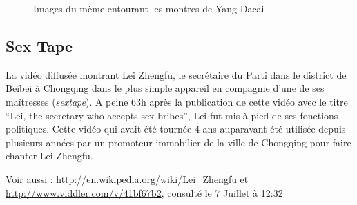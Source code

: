 \begin{figure}[h!]
    \caption{
      Images du mème entourant les montres de Yang Dacai
    }
\end{figure}

\clearpage
\subsection{Sex Tape}
\label{sec:sextape}

La vidéo diffusée montrant Lei Zhengfu, le secrétaire du Parti dans le district de Beibei à Chongqing dans le plus simple appareil en compagnie d'une de ses maîtresses (\textit{sextape}). A peine 63h après la publication de cette vidéo avec le titre ``Lei, the secretary who accepts sex bribes'', Lei fut mis à pied de ses fonctions politiques. Cette vidéo qui avait été tournée 4 ans auparavant été utilisée depuis plusieurs années par un promoteur immobilier de la ville de Chongqing pour faire chanter Lei Zhengfu. 

Voir aussi :
\url{http://en.wikipedia.org/wiki/Lei_Zhengfu}
et 
\url{http://www.viddler.com/v/41bf67b2}, consulté le 7 Juillet à 12:32

